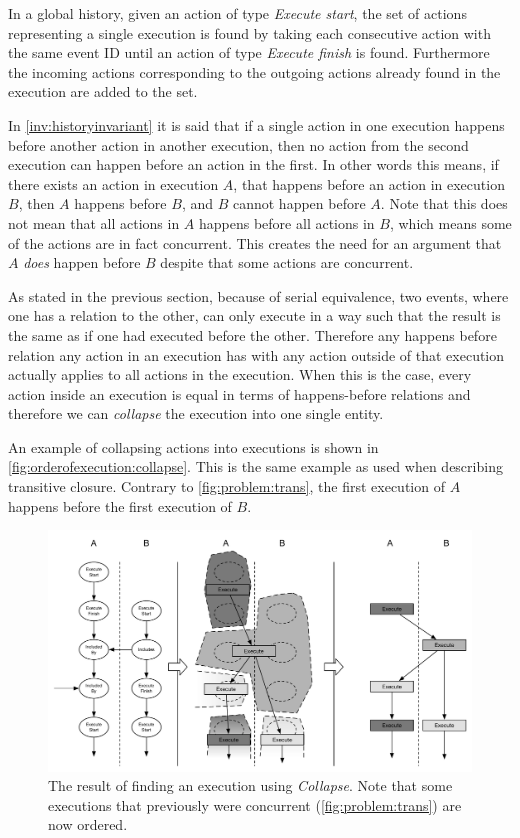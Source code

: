 	\newpar In a global history, given an action of type \textit{Execute start}, the set of actions representing a single execution is found by taking each consecutive action with the same event ID until an action of type \textit{Execute finish} is found. Furthermore the incoming actions corresponding to the outgoing actions already found in the execution are added to the set.
	
	\newpar In \autoref{inv:historyinvariant} it is said that if a single action in one execution happens before another action in another execution, then no action from the second execution can happen before an action in the first. In other words this means, if there exists an action in execution $A$, that happens before an action in execution $B$, then $A$ happens before $B$, and $B$ cannot happen before $A$. Note that this does not mean that all actions in $A$ happens before all actions in $B$, which means some of the actions are in fact concurrent. This creates the need for an argument that $A$ \textit{does} happen before $B$ despite that some actions are concurrent.
	
	\newpar As stated in the previous section, because of serial equivalence, two events, where one has a relation to the other, can only execute in a way such that the result is the same as if one had executed before the other. Therefore any happens before relation any action in an execution has with any action outside of that execution actually applies to all actions in the execution. When this is the case, every action inside an execution is equal in terms of happens-before relations and therefore we can \textit{collapse} the execution into one single entity.
	
	\newpar An example of collapsing actions into executions is shown in \autoref{fig:orderofexecution:collapse}. This is the same example as used when describing transitive closure. Contrary to \autoref{fig:problem:trans}, the first execution of $A$ happens before the first execution of $B$.
	
	\begin{figure}[H]
		\centering
		\includegraphics[width=\textwidth]{5orderofexecution/images/collapse.pdf}
		\caption{The result of finding an execution using \textit{Collapse}. Note that some executions that previously were concurrent (\autoref{fig:problem:trans}) are now ordered.}
		\label{fig:orderofexecution:collapse}
	\end{figure}
	
